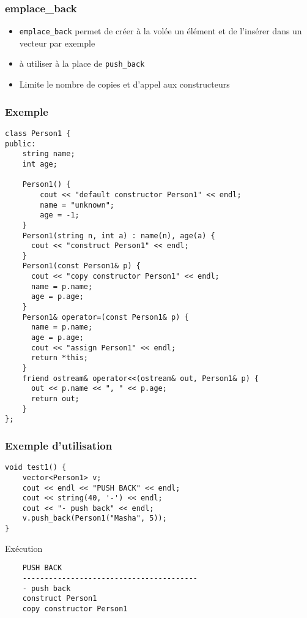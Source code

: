 \begin{frame}[fragile]
\frametitle{emplace\_back}
    \begin{itemize}
        \item \texttt{emplace\_back} permet de créer à la volée un élément et de l'insérer dans un vecteur par exemple 
        \item à utiliser à la place de \texttt{push\_back}
        \item Limite le nombre de copies et d'appel aux constructeurs
    \end{itemize}
\end{frame}

\begin{frame}[fragile]
\frametitle{Exemple}
\begin{lstlisting}
class Person1 {
public:
    string name;
    int age;
 
    Person1() {
        cout << "default constructor Person1" << endl;
        name = "unknown";
        age = -1;
    }
    Person1(string n, int a) : name(n), age(a) {
      cout << "construct Person1" << endl;
    } 
    Person1(const Person1& p) {
      cout << "copy constructor Person1" << endl;
      name = p.name;
      age = p.age;
    }      
    Person1& operator=(const Person1& p) {
      name = p.name;
      age = p.age;
      cout << "assign Person1" << endl;
      return *this;    
    }   
    friend ostream& operator<<(ostream& out, Person1& p) {
      out << p.name << ", " << p.age;
      return out;
    }
};
\end{lstlisting}
\end{frame}

\begin{frame}[fragile]
\frametitle{Exemple d'utilisation}
\begin{lstlisting}
void test1() {
    vector<Person1> v;
    cout << endl << "PUSH BACK" << endl;
    cout << string(40, '-') << endl;
    cout << "- push back" << endl;
    v.push_back(Person1("Masha", 5));
}
\end{lstlisting}
\begin{exampleblock}{Exécution}
\begin{verbatim}
    PUSH BACK
    ----------------------------------------
    - push back
    construct Person1
    copy constructor Person1    
\end{verbatim}
\end{exampleblock}
\end{frame}

